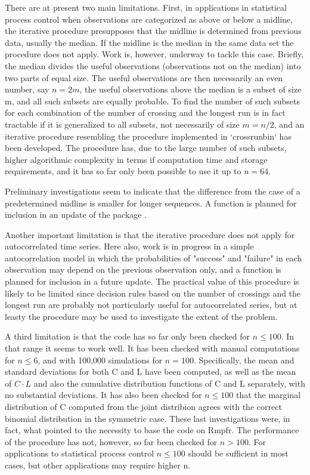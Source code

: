 There are at present two main limitations. First, in applications in statistical process control when observations are categorized as above or below a midline, the iterative procedure presupposes that the midline is determined from previous data, usually the median. If the midline is the median in the same data set the procedure does not apply. Work is, however, underway to tackle this case. Briefly, the median divides the useful observations (observations not on the median) 
into two parts of equal size. The useful observations are then necessarily an even number, say $n=2m$,  the useful observations above the median is a subset of size m, and all such subsets are equally probable. To find the number of such subsets for each combination of the number of crossing and the longest run is in fact tractable if it is generalized to all subsets, not necessarily of size $m=n/2$, and an iterative procedure resembling the procedure implemented in `crossrunbin` has been developed. The procedure has, due to the large number of such subsets, higher algorithmic complexity in terms if computation time and storage requirements, and it has so far only been possible to use it up to $n=64$.

Preliminary investigations seem to indicate that the difference from the case of a predetermined midline is smaller for longer sequences. A function  is planned for inclusion in an update of the package . 

Another important limitation is that the iterative procedure does not apply for autocorrelated time series. Here also, work is in progress in a simple autocorrelation model in which the probabilities of "success" and "failure" in each observation may depend on the previous observation only, and a function  is planned for inclusion in a future update. The practical value of this procedure is likely to be limited  since decision rules based on the number of crossings and the longest run are probably not particularly useful for autocorrelated series, but at leasty the procedure may be used to investigate the extent of the problem.

A third limitation is that the code has so far only been checked for $n \leq 100$. In that range it seems to work well. It has been checked with manual computations for $n \leq 6$, and with 100,000 simulations for $n=100$. Specifically, the mean and standard deviations for both C and L have been computed, as well as the mean of $C \cdot L$ and also the cumulative distribution functions of C and L separately, with no substantial deviations. It has also been checked for $n \leq 100$ that the marginal distribution of C computed from the joint distribion agrees with the correct binomial distribution in the symmetric case. These last investigations were, in fact, what pointed to the necessity to base the code on Rmpfr. The performance of the procedure has not, however, so far been checked for $n>100$. For applications to statistical process control $n \leq 100$ should be sufficient in most cases, but other applications may require higher n.

